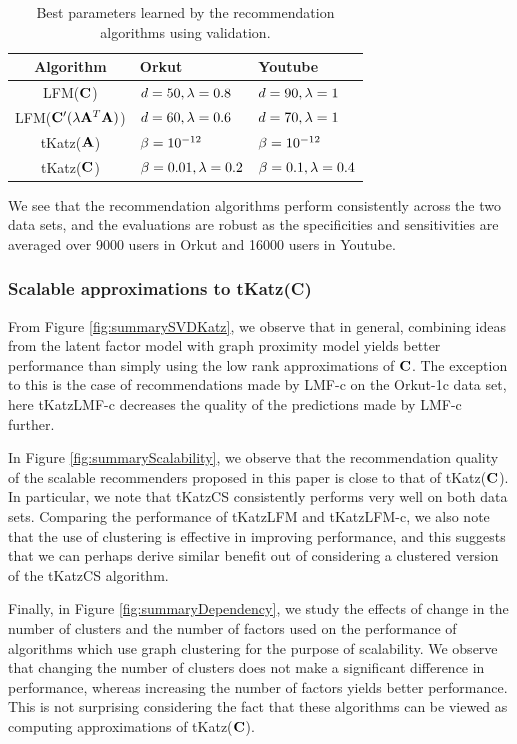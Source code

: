 \begin{table}[t!]
\centering
\begin{tabular}{| c | p{2.4cm} | p{2.4cm} |} \hline
Algorithm&Orkut&Youtube\\ \hline
LFM($\mathbf{C}$) & $d=50, \lambda = 0.8$ & $d = 90, \lambda = 1$ \\ \hline
LFM($\mathbf{C}'(\lambda \mathbf{A}^{T} \mathbf{A})$) & $d = 60, \lambda = 0.6$ & $d = 70, \lambda = 1$ \\ \hline
\textsf{tKatz}($\mathbf{A}$) & $\beta = 10^{-12}$ & $\beta = 10^{-12}$ \\ \hline
\textsf{tKatz}($\mathbf{C}$) & $\beta = 0.01, \lambda = 0.2$ & $\beta = 0.1, \lambda = 0.4$ \\ \hline
\end{tabular}
\caption{Best parameters learned by the recommendation algorithms using validation.}
\label{tab:parameters}
\end{table}

We see that the recommendation algorithms perform consistently across the two data sets, and the evaluations are robust as the specificities and sensitivities are averaged over 9000 users in Orkut and 16000 users in Youtube.

\subsubsection{Scalable approximations to \textsf{tKatz}(C)}
From Figure \ref{fig:summarySVDKatz}, we observe that in general, combining ideas from the latent factor model with graph proximity model yields better performance than simply using the low rank approximations of $\mathbf{C}$. The exception to this is the case of recommendations made by LMF-c on the Orkut-1c data set, here \textsf{tKatzLMF-c} decreases the quality of the predictions made by LMF-c further.

In Figure \ref{fig:summaryScalability}, we observe that the recommendation quality of the scalable recommenders proposed in this paper is close to that of \textsf{tKatz}($\mathbf{C}$). In particular, we note that \textsf{tKatzCS} consistently performs very well on both data sets. Comparing the performance of \textsf{tKatzLFM} and \textsf{tKatzLFM-c}, we also note that the use of clustering is effective in improving performance, and this suggests that we can perhaps derive similar benefit out of considering a clustered version of the \textsf{tKatzCS} algorithm.

Finally, in Figure \ref{fig:summaryDependency}, we study the effects of change in the number of clusters and the number of factors used on the performance of algorithms which use graph clustering for the purpose of scalability. We observe that changing the number of clusters does not make a significant difference in performance, whereas increasing the number of factors yields better performance. This is not surprising considering the fact that these algorithms can be viewed as computing approximations of \textsf{tKatz}($\mathbf{C}$).


